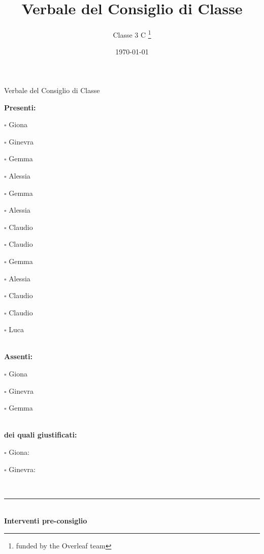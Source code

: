 \documentclass[11pt]{article}
\title{Verbale del Consiglio di Classe}
\author{Classe 3 C \thanks{funded by the Overleaf team}}
\date{\today}
\begin{document}
\begin{center}
	{\huge Verbale del Consiglio di Classe}\\[2cm]
\end{center}
\noindent
{\bf Presenti:}\\[6pt]
\begin{itemize*}
  \item [$\square$]Giona
  \item [$\square$]Ginevra
  \item [$\square$]Gemma
  \item [$\square$]Alessia
  \item [$\square$]Gemma
  \item [$\square$]Alessia
  \item [$\square$]Claudio
  \item [$\square$]Claudio
  \item [$\square$]Gemma
  \item [$\square$]Alessia
  \item [$\square$]Claudio
  \item [$\square$]Claudio
  \item [$\square$]Luca
\end{itemize*}\\[12pt]
{\bf Assenti:}\\[6pt]
\begin{itemize*}
  \item [$\square$]Giona
  \item [$\square$]Ginevra
  \item [$\square$]Gemma
\end{itemize*}\\[12pt]
{\bf dei quali giustificati:}\\[6pt]
\begin{itemize*}
  \item [$\square$]Giona:\\
  \item [$\square$]Ginevra:\\
\end{itemize*}\\[12pt]
\vspace{12pt}
\par\noindent\rule{\textwidth}{0.4pt}\\
{\bf Interventi pre-consiglio}
\end{document}
